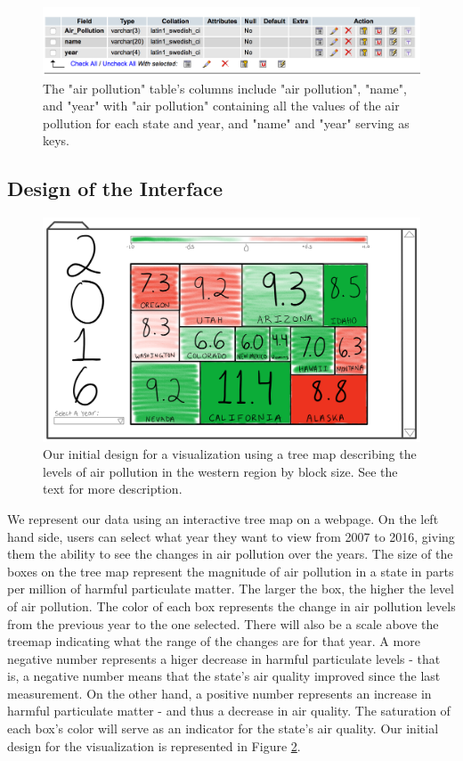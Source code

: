 \documentclass[journal]{vgtc}                %
\begin{document}
\begin{figure}
\centering
\includegraphics[width=\columnwidth]{air_poll_db.png}
\caption{The "air pollution" table's columns include "air pollution", "name", and "year" with "air pollution" 
containing all the values of the air pollution for each state and year, and "name" and "year" serving as keys.}
\label{fig:airPoll}
\end{figure}

\subsection{Design of the Interface}

\begin{figure}
\centering
\includegraphics[width=\columnwidth]{HW1Design.PNG}
\caption{Our initial design for a visualization using a tree map describing the levels of air pollution in the western region by block size. See the text for more description.}
\label{fig:Design}
\end{figure}

We represent our data using an interactive tree map on a webpage. On the left hand side, users can select what year 
they want to view from 2007 to 2016, giving them the ability to see the changes in air pollution over the years. The 
size of the boxes on the tree map represent the magnitude of air pollution in a state in parts per million of harmful particulate matter. The larger the 
box, the higher the level of air pollution. The color of each box represents the change in air pollution levels from the previous 
year to the one selected. There will also be a scale above the treemap indicating what the range of the changes are for that year. 
A more negative number represents a higer decrease in harmful particulate levels - that is, a negative number means
that the state's air quality improved since the last measurement. On the other hand, a positive number represents an increase in harmful
particulate matter - and thus a decrease in air quality. The saturation of each box's color will serve as an indicator for the state's 
air quality. Our initial design for the visualization is represented in Figure \ref{fig:Design}.
\end{document}
